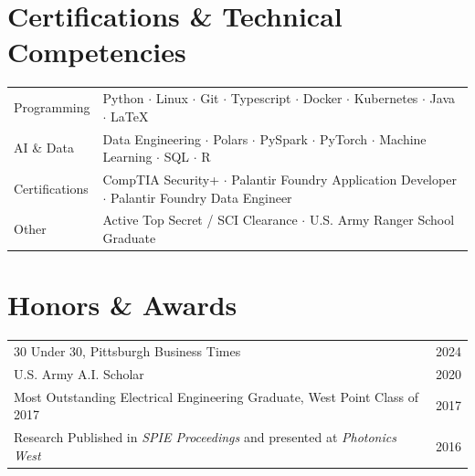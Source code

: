 \documentclass[letterpaper,10pt]{article}
\begin{document}
\section{Certifications \& Technical Competencies}
    \begin{tabularx}{\linewidth}{@{}l X@{}}
        \small Programming &  \footnotesize Python $\cdot$ Linux $\cdot$ Git $\cdot$ Typescript $\cdot$ Docker $\cdot$ Kubernetes $\cdot$ Java $\cdot$ \LaTeX \\
        \small AI \& Data & \footnotesize Data Engineering $\cdot$ Polars $\cdot$ PySpark $\cdot$ PyTorch $\cdot$ Machine Learning $\cdot$ SQL $\cdot$ R \\
        \small Certifications &  \footnotesize CompTIA Security+ $\cdot$ Palantir Foundry Application Developer $\cdot$ Palantir Foundry Data Engineer \\
        \small Other & \footnotesize Active Top Secret / SCI Clearance $\cdot$ U.S. Army Ranger School Graduate \\
    \end{tabularx}
\medskip
\section{Honors \& Awards}
    \begin{tabularx}{\linewidth}{@{}l X@{}}
        \small 30 Under 30, Pittsburgh Business Times & \hfill 2024 \\
        \small U.S. Army A.I. Scholar & \hfill 2020 \\
        \small Most Outstanding Electrical Engineering Graduate, West Point Class of 2017 & \hfill 2017 \\
        \small Research Published in \textit{SPIE Proceedings} and presented at \textit{Photonics West} &  \hfill 2016\\
    \end{tabularx}
\end{document}
